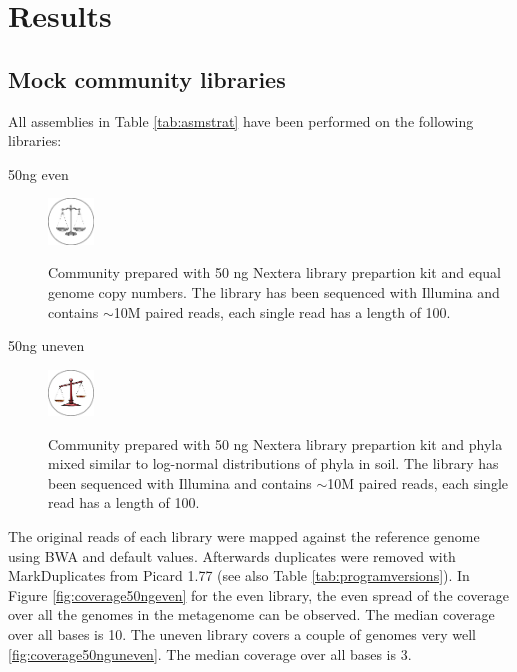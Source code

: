 \documentclass[a4paper,12pt]{report}
\begin{document}
\chapter{Results}

\section{Mock community libraries}
All assemblies in Table \ref{tab:asmstrat} have been performed on the
following libraries:
\begin{description}

\item[50ng even]

    \includegraphics[width=0.1\textwidth]{figures/logos/even.png}

    Community prepared with 50 ng Nextera library prepartion kit and equal
genome copy numbers. The library has been sequenced with Illumina and contains
$\sim$10M paired reads, each single read has a length of 100.

\item[50ng uneven]

    \includegraphics[width=0.1\textwidth]{figures/logos/uneven.png}
    
    Community prepared with 50 ng Nextera library prepartion kit
and phyla mixed similar to log-normal distributions of phyla in soil. The
library has been sequenced with Illumina and contains $\sim$10M paired reads,
each single read has a length of 100.
\end{description}

The original reads of each library were mapped against the reference genome
using BWA \cite{Li20080505} and default values. Afterwards duplicates were
removed with MarkDuplicates from Picard 1.77 (see also Table
\ref{tab:programversions}). In Figure \ref{fig:coverage50ngeven} for the even
library, the even spread of the coverage over all the genomes in the metagenome
can be observed. The median coverage over all bases is 10. The uneven library
covers a couple of genomes very well \ref{fig:coverage50nguneven}. The median
coverage over all bases is 3.\\
\end{document}
